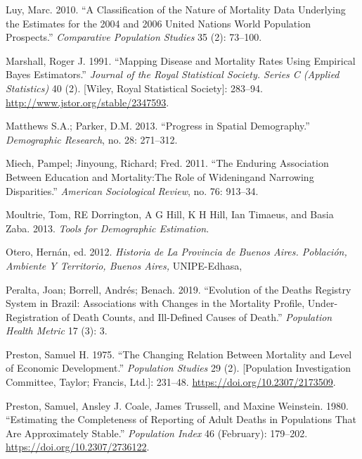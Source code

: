 \documentclass[12pt,]{article}
\begin{document}
\leavevmode\hypertarget{ref-Luy2010}{}%
Luy, Marc. 2010. ``A Classification of the Nature of Mortality Data
Underlying the Estimates for the 2004 and 2006 United Nations World
Population Prospects.'' \emph{Comparative Population Studies} 35 (2):
73--100.

\leavevmode\hypertarget{ref-Marshall1991}{}%
Marshall, Roger J. 1991. ``Mapping Disease and Mortality Rates Using
Empirical Bayes Estimators.'' \emph{Journal of the Royal Statistical
Society. Series C (Applied Statistics)} 40 (2). {[}Wiley, Royal
Statistical Society{]}: 283--94.
\url{http://www.jstor.org/stable/2347593}.

\leavevmode\hypertarget{ref-Matthews2013}{}%
Matthews S.A.; Parker, D.M. 2013. ``Progress in Spatial Demography.''
\emph{Demographic Research}, no. 28: 271--312.

\leavevmode\hypertarget{ref-Miech2011}{}%
Miech, Pampel; Jinyoung, Richard; Fred. 2011. ``The Enduring Association
Between Education and Mortality:The Role of Wideningand Narrowing
Disparities.'' \emph{American Sociological Review}, no. 76: 913--34.

\leavevmode\hypertarget{ref-Moultrie}{}%
Moultrie, Tom, RE Dorrington, A G Hill, K H Hill, Ian Timaeus, and Basia
Zaba. 2013. \emph{Tools for Demographic Estimation}.

\leavevmode\hypertarget{ref-Otero2012}{}%
Otero, Hernán, ed. 2012. \emph{Historia de La Provincia de Buenos Aires.
Población, Ambiente Y Territorio, Buenos Aires,} UNIPE-Edhasa,

\leavevmode\hypertarget{ref-Peralta2019}{}%
Peralta, Joan; Borrell, Andrés; Benach. 2019. ``Evolution of the Deaths
Registry System in Brazil: Associations with Changes in the Mortality
Profile, Under-Registration of Death Counts, and Ill-Defined Causes of
Death.'' \emph{Population Health Metric} 17 (3): 3.

\leavevmode\hypertarget{ref-Preston1975}{}%
Preston, Samuel H. 1975. ``The Changing Relation Between Mortality and
Level of Economic Development.'' \emph{Population Studies} 29 (2).
{[}Population Investigation Committee, Taylor; Francis, Ltd.{]}:
231--48. \url{https://doi.org/10.2307/2173509}.

\leavevmode\hypertarget{ref-Preston1980}{}%
Preston, Samuel, Ansley J. Coale, James Trussell, and Maxine Weinstein.
1980. ``Estimating the Completeness of Reporting of Adult Deaths in
Populations That Are Approximately Stable.'' \emph{Population Index} 46
(February): 179--202. \url{https://doi.org/10.2307/2736122}.
\end{document}
